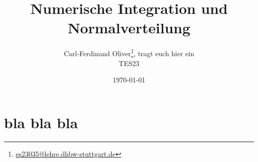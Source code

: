 \documentclass[11pt,a4paper]{scrartcl}
\begin{document}
%
\titlehead{\texttt{[image: dhbw.pdf]}}
\title{Numerische Integration und Normalverteilung}
\author{Carl-Ferdinand Oliver\thanks{\href{mailto:es23035@lehre.dhbw-stuttgart.de}{es23035@lehre.dhbw-stuttgart.de}}, tragt euch hier ein\\TES23}
\date{\today}
\maketitle
\vfill

\thispagestyle{empty}
%
%
\tableofcontents
\thispagestyle{empty}
\cleardoublepage
{} 
\newpage
%
%
\section{bla bla bla}
\label{bla bla}


%
\printbibliography[]
\vfill
\end{document}
